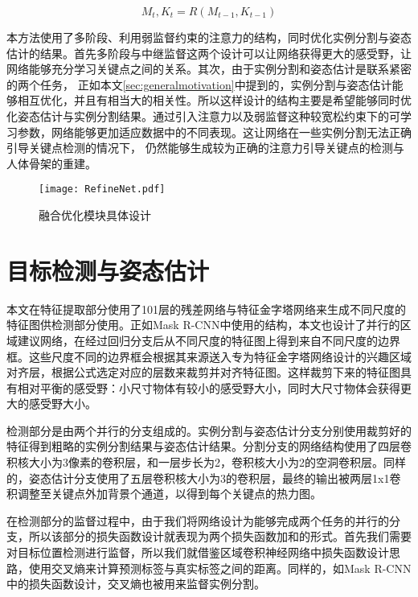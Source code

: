 \begin{equation}
\label{def:refinenet}
M_t, K_t = R(M_{t-1}, K_{t-1})
\end{equation}

本方法使用了多阶段、利用弱监督约束的注意力的结构，同时优化实例分割与姿态估计的结果。首先多阶段与中继监督这两个设计可以让网络获得更大的感受野，让网络能够充分学习关键点之间的关系\cite{wei2016convolutional}。其次，由于实例分割和姿态估计是联系紧密的两个任务， 正如本文\ref{sec:generalmotivation}中提到的，实例分割与姿态估计能够相互优化，并且有相当大的相关性。所以这样设计的结构主要是希望能够同时优化姿态估计与实例分割结果。通过引入注意力以及弱监督这种较宽松约束下的可学习参数，网络能够更加适应数据中的不同表现。这让网络在一些实例分割无法正确引导关键点检测的情况下， 仍然能够生成较为正确的注意力引导关键点的检测与人体骨架的重建。

\begin{figure*}[htbp]	
	\centering
	\texttt{[image: RefineNet.pdf]}
	\caption{融合优化模块具体设计}
	\label{fig:RefineNet}
\end{figure*}

\section{目标检测与姿态估计}
\label{sec:detectionstage}
本文在特征提取部分使用了101层的残差网络与特征金字塔网络来生成不同尺度的特征图供检测部分使用。正如Mask R-CNN\cite{He2017Mask}中使用的结构，本文也设计了并行的区域建议网络，在经过回归分支后从不同尺度的特征图上得到来自不同尺度的边界框。这些尺度不同的边界框会根据其来源送入专为特征金字塔网络设计的兴趣区域对齐层，根据公式选定对应的层数来裁剪并对齐特征图\cite{Lin2016Feature}。这样裁剪下来的特征图具有相对平衡的感受野：小尺寸物体有较小的感受野大小，同时大尺寸物体会获得更大的感受野大小。

检测部分是由两个并行的分支组成的。实例分割与姿态估计分支分别使用裁剪好的特征得到粗略的实例分割结果与姿态估计结果。分割分支的网络结构使用了四层卷积核大小为3像素的卷积层，和一层步长为2，卷积核大小为2的空洞卷积层。同样的，姿态估计分支使用了五层卷积核大小为3的卷积层，最终的输出被两层1x1卷积调整至关键点外加背景个通道，以得到每个关键点的热力图。


在检测部分的监督过程中，由于我们将网络设计为能够完成两个任务的并行的分支，所以该部分的损失函数设计就表现为两个损失函数加和的形式。首先我们需要对目标位置检测进行监督，所以我们就借鉴区域卷积神经网络\cite{Girshick_2014_CVPR}中损失函数设计思路，使用交叉熵来计算预测标签与真实标签之间的距离。同样的，如Mask R-CNN\cite{He2017Mask}中的损失函数设计，交叉熵也被用来监督实例分割。
     

